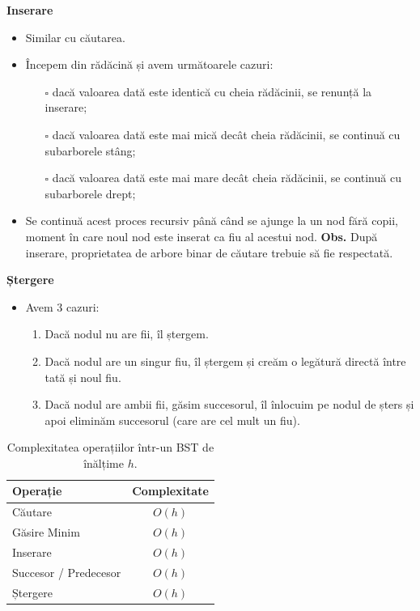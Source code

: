 \documentclass[11pt,a4paper]{article}
\theoremstyle{definition}
\theoremstyle{plain}
\theoremstyle{remark}
\begin{document}
\textbf{Inserare}
\begin{itemize}
  \item Similar cu căutarea.
  \item Începem din rădăcină și avem următoarele cazuri:
    \begin{itemize}
      \item[$\square$] dacă valoarea dată este identică cu cheia rădăcinii, se renunță la inserare;
      \item[$\square$] dacă valoarea dată este mai mică decât cheia rădăcinii, se continuă cu subarborele stâng;
      \item[$\square$] dacă valoarea dată este mai mare decât cheia rădăcinii, se continuă cu subarborele drept;
    \end{itemize}
  \item Se continuă acest proces recursiv până când se ajunge la un nod fără copii, moment în care noul nod este inserat ca fiu al acestui nod.
    \textbf{Obs.} După inserare, proprietatea de arbore binar de căutare trebuie să fie respectată.
\end{itemize}



\textbf{Ștergere}
\begin{itemize}
  \item Avem 3 cazuri:
  \begin{enumerate}
    \item Dacă nodul nu are fii, îl ștergem.
    \item Dacă nodul are un singur fiu, îl ștergem și creăm o legătură directă între tată și noul fiu.
    \item Dacă nodul are ambii fii, găsim succesorul, îl înlocuim pe nodul de șters și apoi eliminăm succesorul (care are cel mult un fiu).
  \end{enumerate}
\end{itemize}

\begin{table}[h]
\centering
\begin{tabular}{l c}
\toprule
\textbf{Operație} & \textbf{Complexitate} \\
\midrule
Căutare                & \(O(h)\) \\
Găsire Minim           & \(O(h)\) \\
Inserare               & \(O(h)\) \\
Succesor / Predecesor   & \(O(h)\) \\
Ștergere               & \(O(h)\) \\
\bottomrule
\end{tabular}
\caption{Complexitatea operațiilor într-un BST de înălțime \(h\).}
\end{table}
\end{document}
